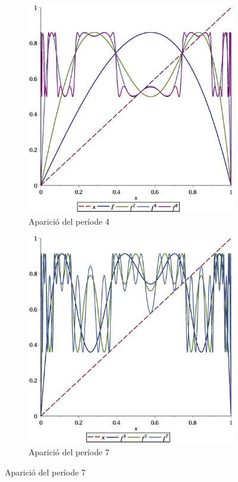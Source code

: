 \documentclass[a4paper]{article}
\theoremstyle{definition}
\begin{document}
\begin{figure}[ht]
  \begin{subfigure}[ht]{0.45\linewidth}
    \centering
    \includegraphics[width=\linewidth]{Images/map32.eps}
    \caption{Aparició del període 4}
  \end{subfigure}
  \hfill
  \begin{subfigure}[ht]{0.45\linewidth}
    \centering
    \includegraphics[width=\linewidth]{Images/map35.eps}
    \caption{Aparició del període 7}
  \end{subfigure}
\end{figure}
\end{document}
